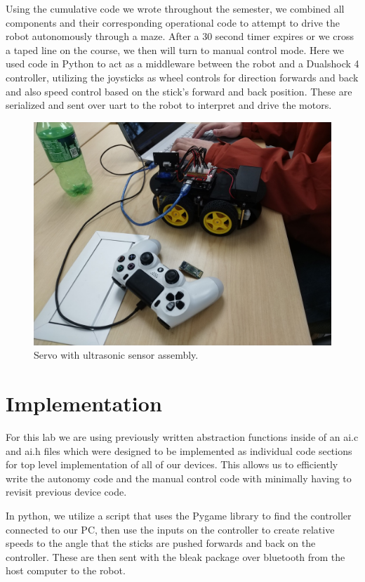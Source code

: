 \documentclass[letterpaper,11pt]{texMemo} %
\begin{document}
Using the cumulative code we wrote throughout the semester, we combined all components and 
their corresponding operational code to attempt to drive the robot autonomously through a maze.
After a 30 second timer expires or we cross a taped line on the course, we then will turn 
to manual control mode. Here we used code in Python to act as a middleware between the robot and 
a Dualshock 4 controller, utilizing the joysticks as wheel controls for direction forwards and back 
and also speed control based on the stick's forward and back position. These are serialized and sent over
uart to the robot to interpret and drive the motors.

\begin{figure}[!ht]
\begin{center}
\includegraphics[width=\linewidth]{robot.jpg}
\end{center}
\caption{Servo with ultrasonic sensor assembly.}
\label{fig:f4}
\end{figure}

\section*{Implementation}
For this lab we are using previously written abstraction functions inside of an 
ai.c and ai.h files which were designed to be implemented as individual code
sections for top level implementation of all of our devices. This allows us 
to efficiently write the autonomy code and the manual control code with minimally
having to revisit previous device code.

In python, we utilize a script that uses the Pygame library to find the controller 
connected to our PC, then use the inputs on the controller to create relative speeds 
to the angle that the sticks are pushed forwards and back on the controller. These 
are then sent with the bleak package over bluetooth from the host computer to the 
robot.
\end{document}
